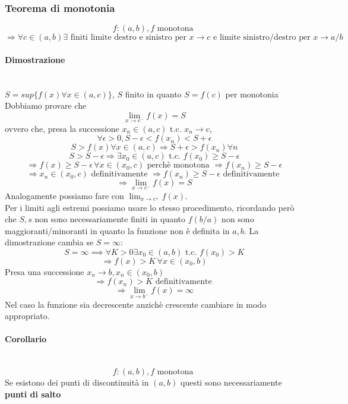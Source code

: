 \documentclass{report}
\newcommand{\subsubsubsection}[1]{\paragraph{#1}\mbox{}\\}
\begin{document}
        \subsubsection{Teorema di monotonia}
            $$f:\left(a, b\right), f \textrm{ monotona }$$
            $$\Longrightarrow \forall c \in \left(a, b\right) \exists \textrm{ finiti limite 
            destro e sinistro per } x \rightarrow c \textrm{ e limite sinistro/destro per } x \rightarrow a/b$$
            \subsubsubsection{Dimostrazione}
                $S = sup\{f\left(x\right) \forall x \in \left(a, c\right)\}$, $S$ finito in quanto $S = f\left(c\right)$ per monotonia \\
                Dobbiamo provare che
                $$\lim_{x \to c^-} f\left(x\right) = S$$
                ovvero che, presa la successione $x_n \in \left(a, c\right)\textrm{ t.c. } x_n \rightarrow c$,
                $$\forall\epsilon > 0, S-\epsilon < f\left(x_n\right) < S+\epsilon$$
                $$S > f\left(x\right) \forall x \in \left(a, c\right) \Longrightarrow S+\epsilon > f\left(x_n\right) \forall n$$
                $$S > S-\epsilon \Longrightarrow \exists x_0 \in \left(a, c\right) \textrm{ t.c. } f\left(x_0\right) \geq S-\epsilon$$
                $$\Longrightarrow f\left(x\right) \geq S-\epsilon \, \forall x \in \left(x_0, c\right) \textrm{ perchè monotona } \Longrightarrow f\left(x_n\right) \geq S-\epsilon$$
                $$\Longrightarrow x_n \in \left(x_0, c\right) \textrm{ definitivamente } \Longrightarrow f\left(x_n\right) \geq S - \epsilon \textrm{ definitivamente }$$
                $$\Longrightarrow \lim_{x \to c^-} f\left(x\right) = S$$
                Analogamente possiamo fare con $\lim_{x \to c^+} f\left(x\right)$. \\
                Per i limiti agli estremi possiamo usare lo stesso procedimento, ricordando però che $S, s$ non 
                sono necessariamente finiti in quanto $f\left(b/a\right)$ non sono maggioranti/minoranti in quanto 
                la funzione non è definita in $a, b$. La dimostrazione cambia se $S = \infty$:
                $$S = \infty \implies \forall K > 0 \exists x_0 \in \left(a, b\right) \textrm{ t.c. } f\left(x_0\right) > K$$
                $$\Longrightarrow f\left(x\right) > K \, \forall x \in \left(x_0, b\right)$$
                Presa una successione $x_n \rightarrow b, x_n \in \left(x_0, b\right)$
                $$\Longrightarrow f\left(x_n\right) > K \textrm{ definitivamente }$$
                $$\Longrightarrow \lim_{x \to b^-} f\left(x\right) = \infty$$
                Nel caso la funzione sia decrescente anzichè crescente cambiare in modo appropriato.
            \subsubsubsection{Corollario}
                $$f:\left(a, b\right), f \textrm{ monotona }$$
                Se esistono dei punti di discontinuità in $\left(a, b\right)$ questi
                sono necessariamente \textbf{punti di salto}
\end{document}
